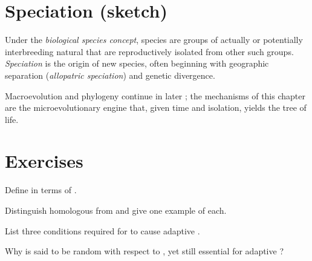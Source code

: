\section{Speciation (sketch)}

\begin{definition}\label{def:g11:evolution-mechanisms:species}
Under the \emph{biological species concept},
species are groups of actually or potentially interbreeding natural 
that are reproductively isolated from other such groups. \emph{Speciation}
 is the origin of new species, often beginning with geographic
separation (\emph{allopatric speciation}) and
genetic divergence.
\end{definition}

\begin{remark}
Macroevolution and phylogeny continue in later ; the mechanisms of this
chapter are the microevolutionary engine that, given time and isolation, yields
the tree of life.
\end{remark}

\section{Exercises}

\begin{exercise}[$\star$]\label{exo:g11:evolution-mechanisms:1}
Define  in terms of .
\end{exercise}

\begin{exercise}[$\star$]\label{exo:g11:evolution-mechanisms:2}
Distinguish homologous from  and give one example of each.
\end{exercise}

\begin{exercise}[$\star$]\label{exo:g11:evolution-mechanisms:3}
List three conditions required for  to cause adaptive .
\end{exercise}

\begin{exercise}[$\star\star$]\label{exo:g11:evolution-mechanisms:4}
Why is  said to be random with respect to , yet still essential
for adaptive ?
\end{exercise}

